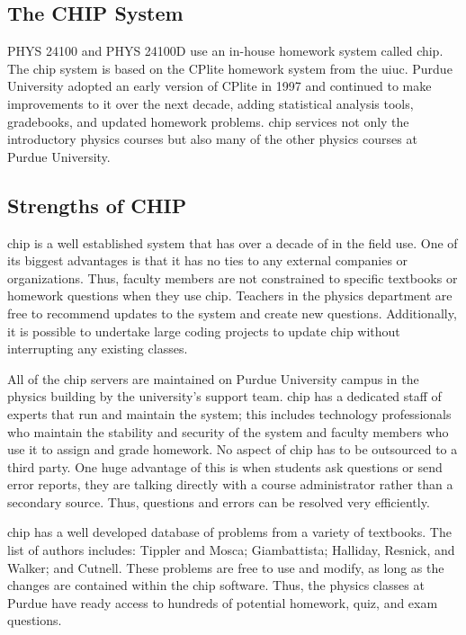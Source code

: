 \subsection{The CHIP System}

PHYS 24100 and PHYS 24100D use an in-house homework system called \gls{chip}. The \gls{chip} system is based on the CPlite homework system from the \gls{uiuc}. Purdue University adopted an early version of CPlite in 1997 and continued to make improvements to it over the next decade, adding statistical analysis tools, gradebooks, and updated homework problems. \gls{chip} services not only the introductory physics courses but also many of the other physics courses at Purdue University.

\subsection{Strengths of CHIP}

\gls{chip} is a well established system that has over a decade of in the field use. One of its biggest advantages is that it has no ties to any external companies or organizations. Thus, faculty members are not constrained to specific textbooks or homework questions when they use \gls{chip}. Teachers in the physics department are free to recommend updates to the system and create new questions. Additionally, it is possible to undertake large coding projects to update \gls{chip} without interrupting any existing classes.

All of the \gls{chip} servers are maintained on Purdue University campus in the physics building by the university's support team. \gls{chip} has a dedicated staff of experts that run and maintain the system; this includes technology professionals who maintain the stability and security of the system and faculty members who use it to assign and grade homework. No aspect of \gls{chip} has to be outsourced to a third party. One huge advantage of this is when students ask questions or send error reports, they are talking directly with a course administrator rather than a secondary source. Thus, questions and errors can be resolved very efficiently.

\gls{chip} has a well developed database of problems from a variety of textbooks. The list of authors includes: Tippler and Mosca\cite{tipler2003}; Giambattista\cite{giambattista2009}; Halliday, Resnick, and Walker\cite{hrw2013}; and Cutnell\cite{cutnell2009}. These problems are free to use and modify, as long as the changes are contained within the \gls{chip} software. Thus, the physics classes at Purdue have ready access to hundreds of potential homework, quiz, and exam questions.


